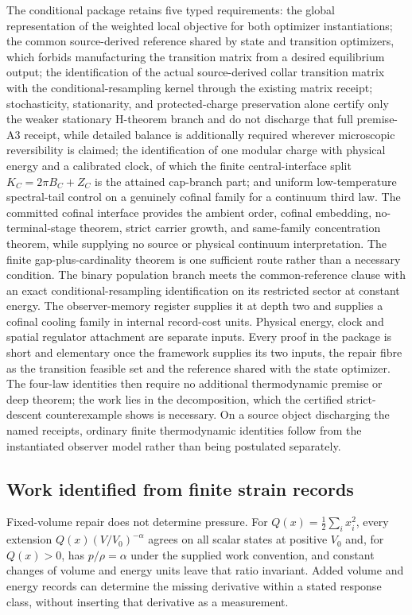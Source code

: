 \documentclass[11pt]{article}
\begin{document}
The conditional package retains five typed requirements: the global
representation of the weighted local objective for both optimizer
instantiations; the common source-derived reference shared by state and
transition optimizers, which forbids manufacturing the transition
matrix from a desired equilibrium output; the identification of the
actual source-derived collar transition matrix with the
conditional-resampling kernel through the existing matrix receipt;
stochasticity, stationarity, and protected-charge preservation alone
certify only the weaker stationary H-theorem branch and do not discharge
that full premise-A3 receipt, while detailed balance is additionally required
wherever microscopic reversibility is claimed; the
identification of one modular charge with physical energy and a
calibrated clock, of which the finite central-interface split
\(K_C=2\pi B_C+Z_C\) is the attained cap-branch part; and
uniform low-temperature spectral-tail control on a genuinely cofinal family
for a continuum third law. The committed cofinal interface provides the
ambient order, cofinal embedding, no-terminal-stage theorem, strict carrier
growth, and same-family concentration theorem, while supplying no source or
physical continuum interpretation. The finite
gap-plus-cardinality theorem is one sufficient route rather than a
necessary condition. The binary population branch meets the common-reference
clause with an exact conditional-resampling identification on its restricted
sector at constant energy. The observer-memory register supplies it at
depth two and supplies a cofinal cooling family in internal record-cost
units. Physical energy, clock and spatial regulator attachment are separate
inputs. Every
proof in the package is short and elementary once the framework
supplies its two inputs, the repair fibre as the transition feasible
set and the reference shared with the state optimizer. The four-law
identities then require no additional thermodynamic premise or deep theorem;
the work lies in the decomposition, which the certified strict-descent
counterexample shows is necessary. On a source object discharging the named receipts,
ordinary finite thermodynamic identities follow from the instantiated
observer model rather than being postulated separately.

\subsection{Work identified from finite strain records}

Fixed-volume repair does not determine pressure. For
$Q(x)=\frac12\sum_i x_i^2$, every extension
$Q(x)(V/V_0)^{-\alpha}$ agrees on all scalar states at positive $V_0$ and,
for $Q(x)>0$, has $p/\rho=\alpha$ under the supplied work convention, and
constant changes of volume and energy units leave that ratio invariant. Added volume and
energy records can determine the missing derivative within a stated
response class, without inserting that derivative as a measurement.
\end{document}
